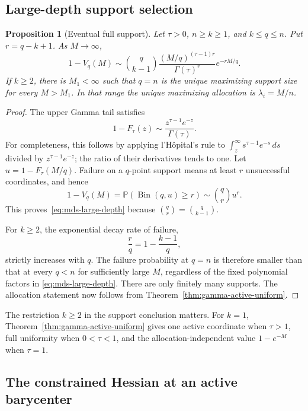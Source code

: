 \documentclass[11pt]{article}
\newtheorem{proposition}[theorem]{Proposition}
\theoremstyle{definition}
\theoremstyle{remark}
\DeclareMathOperator{\Bin}{Bin}
\newcommand{\Pbb}{\mathbb P}
\newcommand{\1}{\mathbf 1}
\begin{document}
\subsection{Large-depth support selection}

\begin{proposition}[Eventual full support]
\label{prop:mds-large-depth}
Let \(\tau>0\), \(n\ge k\ge1\), and \(k\le q\le n\).  Put
\(r=q-k+1\).  As \(M\to\infty\),
\begin{equation}\label{eq:mds-large-depth}
  1-V_q(M)
  \sim
  \binom q{k-1}
  \frac{(M/q)^{(\tau-1)r}}{\Gamma(\tau)^r}
  e^{-rM/q}.
\end{equation}
If \(k\ge2\), there is \(M_1<\infty\) such that \(q=n\) is the
unique maximizing support size for every \(M>M_1\).  In that range
the unique maximizing allocation is \(\lambda_i=M/n\).
\end{proposition}

\begin{proof}
The upper Gamma tail satisfies
\[
  1-F_\tau(z)\sim\frac{z^{\tau-1}e^{-z}}{\Gamma(\tau)}.
\]
For completeness, this follows by applying l'H\^opital's rule to
\(\int_z^\infty s^{\tau-1}e^{-s}\,ds\) divided by
\(z^{\tau-1}e^{-z}\); the ratio of their derivatives tends to one.
Let \(u=1-F_\tau(M/q)\).  Failure on a \(q\)-point support means at
least \(r\) unsuccessful coordinates, and hence
\[
  1-V_q(M)=\Pbb(\Bin(q,u)\ge r)
  \sim\binom qr u^r.
\]
This proves~\eqref{eq:mds-large-depth} because
\(\binom qr=\binom q{k-1}\).

For \(k\ge2\), the exponential decay rate of failure,
\[
  \frac rq=1-\frac{k-1}{q},
\]
strictly increases with \(q\).  The failure probability at \(q=n\)
is therefore smaller than that at every \(q<n\) for sufficiently
large \(M\), regardless of the fixed polynomial factors in
\eqref{eq:mds-large-depth}.  There are only finitely many supports.
The allocation statement now follows from
Theorem~\ref{thm:gamma-active-uniform}.
\end{proof}

The restriction \(k\ge2\) in the support conclusion matters.  For
\(k=1\), Theorem~\ref{thm:gamma-active-uniform} gives one active
coordinate when \(\tau>1\), full uniformity when \(0<\tau<1\), and
the allocation-independent value \(1-e^{-M}\) when \(\tau=1\).

\subsection{The constrained Hessian at an active barycenter}
\end{document}
